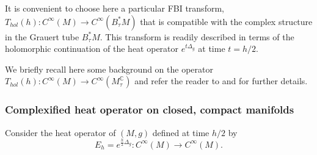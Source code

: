 \documentclass[11pt,reqno]{amsart}
\newcommand{\C}{{\mathbb C}}
\theoremstyle{definition}
\begin{document}









It is convenient to choose here a particular FBI transform, $T_{hol}(h): C^{\infty}(M) \to C^{\infty}(B_{\tau}^*M)$ that is compatible with the complex structure in the Grauert tube $B_{\tau}^*M.$ This transform is readily described  in terms of the holomorphic continuation of the heat operator $e^{t \Delta_g}$ at time $t = h/2.$ 

We briefly recall here some background on the operator $T_{hol}(h): C^{\infty}(M) \to C^{\infty}(M_{\tau}^{\C})$ and refer the reader to \cite{GLS96} and \cite{GT19} for further details.

\subsubsection{Complexified heat operator on closed, compact manifolds} \label{heat}
Consider the heat operator of $(M,g)$ defined at time $h/2$ by $$E_{h}=e^{\frac{h}{2}\Delta_g}:C^{\infty}(M) \to C^{\infty}(M).$$
\end{document}
